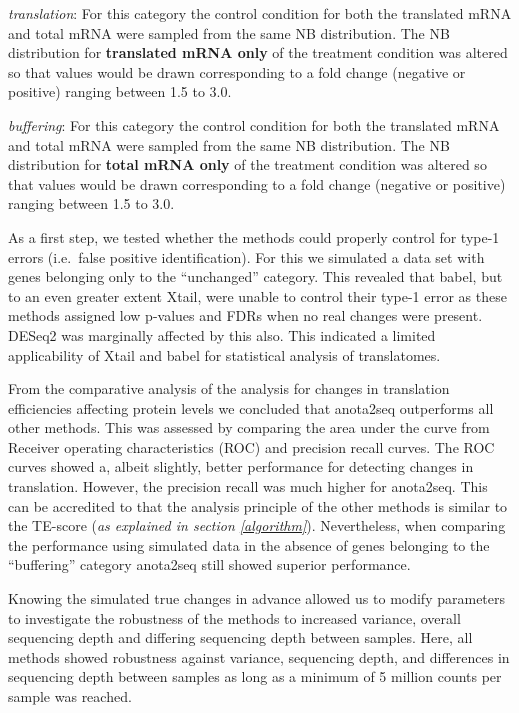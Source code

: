 \documentclass[
  12pt,
  openany]{book}
\begin{document}
\emph{translation}: For this category the control condition for both the translated mRNA and total mRNA were sampled from the same NB distribution. The NB distribution for \textbf{translated mRNA only} of the treatment condition was altered so that values would be drawn corresponding to a fold change (negative or positive) ranging between 1.5 to 3.0.

\emph{buffering}: For this category the control condition for both the translated mRNA and total mRNA were sampled from the same NB distribution. The NB distribution for \textbf{total mRNA only} of the treatment condition was altered so that values would be drawn corresponding to a fold change (negative or positive) ranging between 1.5 to 3.0.

As a first step, we tested whether the methods could properly control for type-1 errors (i.e.~false positive identification). For this we simulated a data set with genes belonging only to the ``unchanged'' category. This revealed that babel, but to an even greater extent Xtail, were unable to control their type-1 error as these methods assigned low p-values and FDRs when no real changes were present. DESeq2 was marginally affected by this also. This indicated a limited applicability of Xtail and babel for statistical analysis of translatomes.

From the comparative analysis of the analysis for changes in translation efficiencies affecting protein levels we concluded that anota2seq outperforms all other methods. This was assessed by comparing the area under the curve from Receiver operating characteristics (ROC) and precision recall curves. The ROC curves showed a, albeit slightly, better performance for detecting changes in translation. However, the precision recall was much higher for anota2seq. This can be accredited to that the analysis principle of the other methods is similar to the TE-score (\emph{as explained in section \ref{algorithm}}). Nevertheless, when comparing the performance using simulated data in the absence of genes belonging to the ``buffering'' category anota2seq still showed superior performance.

Knowing the simulated true changes in advance allowed us to modify parameters to investigate the robustness of the methods to increased variance, overall sequencing depth and differing sequencing depth between samples. Here, all methods showed robustness against variance, sequencing depth, and differences in sequencing depth between samples as long as a minimum of 5 million counts per sample was reached.
\end{document}
